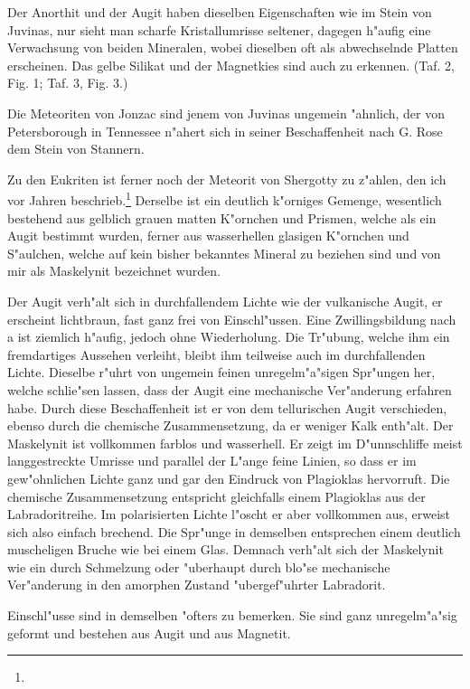 \documentclass[a4paper, 11pt, oneside, polutonikogreek, german]{article}
\begin{document}
Der Anorthit und der Augit haben dieselben Eigenschaften wie im Stein von Juvinas, nur sieht man scharfe Kristallumrisse seltener, dagegen h"aufig eine Verwachsung von beiden Mineralen, wobei dieselben oft als abwechselnde Platten erscheinen. Das gelbe Silikat und der Magnetkies sind auch zu erkennen. (Taf. 2, Fig. 1; Taf. 3, Fig. 3.)

Die Meteoriten von Jonzac sind jenem von Juvinas ungemein "ahnlich, der von Petersborough in Tennessee n"ahert sich in seiner Beschaffenheit nach G. Rose dem Stein von Stannern.

Zu den Eukriten ist ferner noch der Meteorit von Shergotty zu z"ahlen, den ich vor Jahren beschrieb.\footnote{} Derselbe ist ein deutlich k"orniges Gemenge, wesentlich bestehend aus gelblich grauen matten K"ornchen und Prismen, welche als ein Augit bestimmt wurden, ferner aus wasserhellen glasigen K"ornchen und S"aulchen, welche auf kein bisher bekanntes Mineral zu beziehen sind und von mir als Maskelynit bezeichnet wurden.

Der Augit verh"alt sich in durchfallendem Lichte wie der vulkanische Augit, er erscheint lichtbraun, fast ganz frei von Einschl"ussen. Eine Zwillingsbildung nach a ist ziemlich h"aufig, jedoch ohne Wiederholung. Die Tr"ubung, welche ihm ein fremdartiges Aussehen verleiht, bleibt ihm teilweise auch im durchfallenden Lichte. Dieselbe r"uhrt von ungemein feinen unregelm"a"sigen Spr"ungen her, welche schlie"sen lassen, dass der Augit eine mechanische Ver"anderung erfahren habe. Durch diese Beschaffenheit ist er von dem tellurischen Augit verschieden, ebenso durch die chemische Zusammensetzung, da er weniger Kalk enth"alt. Der Maskelynit ist vollkommen farblos und wasserhell. Er zeigt im D"unnschliffe meist langgestreckte Umrisse und parallel der L"ange feine Linien, so dass er im gew"ohnlichen Lichte ganz und gar den Eindruck von Plagioklas hervorruft. Die chemische Zusammensetzung entspricht gleichfalls einem Plagioklas aus der Labradoritreihe. Im polarisierten Lichte l"oscht er aber vollkommen aus, erweist sich also einfach brechend. Die Spr"unge in demselben entsprechen einem deutlich muscheligen Bruche wie bei einem Glas. Demnach verh"alt sich der Maskelynit wie ein durch Schmelzung oder "uberhaupt durch blo"se mechanische Ver"anderung in den amorphen Zustand "ubergef"uhrter Labradorit.

Einschl"usse sind in demselben "ofters zu bemerken. Sie sind ganz unregelm"a"sig geformt und bestehen aus Augit und aus Magnetit.
\end{document}
